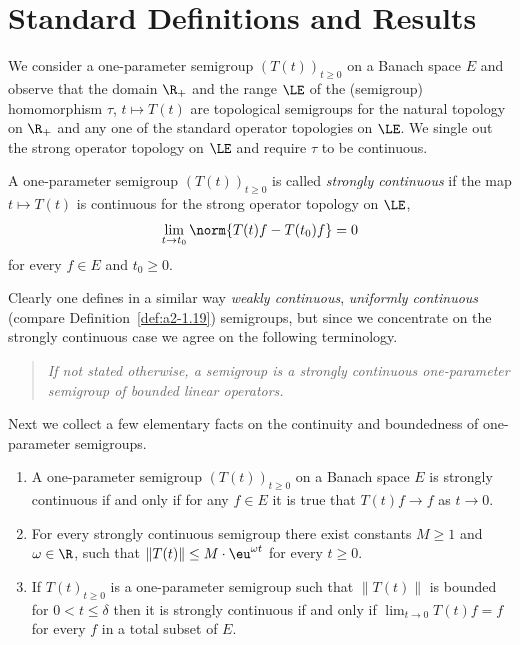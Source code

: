 \section{Standard Definitions and Results}\label{sec:a1-1}%
We consider a one-parameter semigroup $(T(t))_{t \geq 0}$ on a Banach space $E$ and observe that the domain $\R_{+}$ and the range $\LE$ of the (semigroup) homomorphism $\tau $, $ t \mapsto T(t)$ are topological semigroups for the natural topology on $\R_{+}$ and any one of the standard operator topologies on $\LE$.
We single out the strong operator topology on $\LE$ and require $\tau$ to be continuous.
\begin{definition}\label{def:a1-1.1}
A one-parameter semigroup $(T(t))_{t\geq0}$ is called \emph{strongly continuous} if the map $t \mapsto T(t)$ is continuous for the strong operator topology on $\LE$, \eg
\[
	\lim_{t\to t_{0}} \norm{T(t)f - T(t_{0})f} = 0
\]
for every $f \in E$ and $t_{0} \geq 0$.
\end{definition}
Clearly one defines in a similar way \emph{weakly continuous}, \resp \emph{uniformly continuous} (compare Definition~\ref{def:a2-1.19}) semigroups, but since we concentrate on the strongly continuous case we agree on the following terminology.
\begin{quote}
\textit{If not stated otherwise, a \emph{semigroup} is a strongly continuous one-parameter semigroup of bounded linear operators. }
\end{quote}
Next we collect a few elementary facts on the continuity and boundedness of one-parameter semigroups.
\begin{remarks}\label{rem:a1-1.2}
\begin{enumerate}[\upshape(i), wide, labelindent=.25em]

\item 
A one-parameter semigroup $(T(t))_{t \geq 0}$ on a Banach space $E$ is strongly continuous if and only if for any $f \in E$ it is true that $T(t)f \to f$ as $t \to 0$.

\item 
For every strongly continuous semigroup there exist constants $ M \geq 1 $ and $ \omega \in \R $, such that 
$ \lVert T(t) \rVert \leq M \cdot \eu^{ \omega t} $ for every $  t \geq 0 $.

\item If\/ $ T(t)_{t\geq0} $ is a one-parameter semigroup such that $ \lVert T(t) \rVert $ is bounded for
$ 0 < t \leq \delta $ then it is strongly continuous if and only if\/ $ \lim_{t\to0} T(t)f = f $ for every $ f $ in a total subset of\/ $ E $.

\end{enumerate}
\end{remarks}
